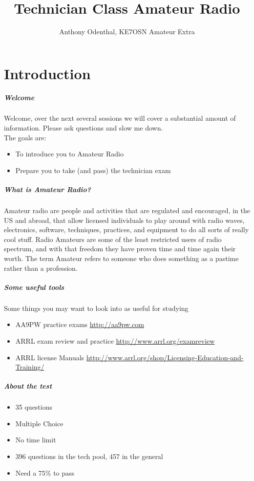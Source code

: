 \documentclass[10pt]{beamer}
\author{Anthony Odenthal, KE7OSN Amateur Extra}
\title{Technician Class Amateur Radio}
\begin{document}
\frame{\titlepage}


\part{Introduction}

\begin{frame}
\frametitle{Welcome}
Welcome, over the next several sessions we will cover a substantial amount of information. Please ask questions and slow me down.\\
The goals are:
\begin{itemize}
\item To introduce you to Amateur Radio \pause
\item Prepare you to take (and pass) the technician exam \pause
\end{itemize}
\end{frame}

\begin{frame}
\frametitle{What is Amateur Radio?}
Amateur radio are people and activities that are regulated and encouraged, in the US and abroad, that allow licensed individuals to play around with radio waves, electronics, software, techniques, practices, and equipment to do all sorts of really cool stuff. Radio Amateurs are some of the least restricted users of radio spectrum, and with that freedom they have proven time and time again their worth.
The term Amateur refers to someone who does something as a pastime rather than a profession.
\end{frame}

\begin{frame}
\frametitle{Some useful tools}
Some things you may want to look into as useful for studying
\begin{itemize}
\item AA9PW practice exams \url{http://aa9pw.com}
\item ARRL exam review and practice \url{http://www.arrl.org/examreview}
\item ARRL license Manuals \url{http://www.arrl.org/shop/Licensing-Education-and-Training/}
\end{itemize}
\end{frame}

\begin{frame}
\frametitle{About the test}
\begin{itemize}
\item 35 questions \pause
\item Multiple Choice \pause
\item No time limit \pause
\item 396 questions in the tech pool, 457 in the general \pause
\item Need a 75\% to pass
\end{itemize}
\end{frame}
\end{document}
